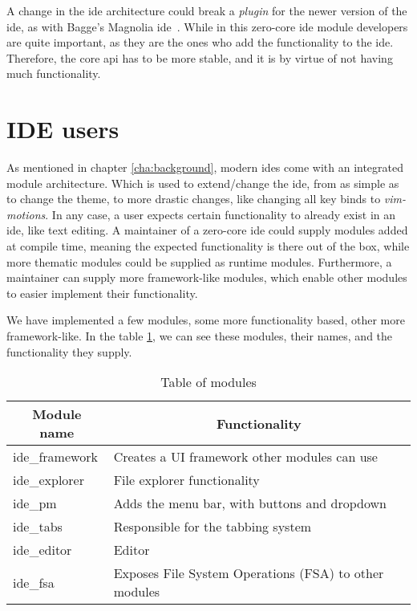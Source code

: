 A change in the \gls*{ide} architecture could break a \textit{plugin} for the
newer version of the \gls*{ide}, as with Bagge's Magnolia \gls*{ide}~\cite{baggeIde}.
While in this zero-core \gls*{ide} module developers are quite important, as they
are the ones who add the functionality to the \gls*{ide}. Therefore, the core
\gls*{api} has to be more stable, and it is by virtue of not having much
functionality.


\section{IDE users} \label{sec:user}

As mentioned in chapter \ref{cha:background}, modern \gls*{ide}s come with an
integrated module architecture. Which is used to extend/change the \gls*{ide},
from as simple as to change the theme, to more drastic changes, like changing
all key binds to \textit{vim-motions}. In any case, a user expects certain
functionality to already exist in an \gls*{ide}, like text editing. A maintainer
of a zero-core \gls*{ide} could supply modules added at compile time, meaning the
expected functionality is there out of the box, while more thematic modules
could be supplied as runtime modules. Furthermore, a maintainer can supply more
framework-like modules, which enable other modules to easier implement their
functionality.

We have implemented a few modules, some more functionality based, other more
framework-like. In the table \ref{tab:modules}, we can see these modules, their
names, and the functionality they supply.

\begin{table}[H]
  \caption{Table of modules}\label{tab:modules}
  \begin{center}
    \begin{tabular}[c]{l|l}
      \hline
      \multicolumn{1}{c|}{\textbf{Module name}} &
      \multicolumn{1}{c}{\textbf{Functionality}} \\
      \hline
      ide\_framework & Creates a UI framework other modules can use \\
      ide\_explorer & File explorer functionality \\
      ide\_pm & Adds the menu bar, with buttons and dropdown \\
      ide\_tabs & Responsible for the tabbing system \\
      ide\_editor & Editor \\
      ide\_fsa & Exposes File System Operations (FSA) to other modules \\
      \hline
    \end{tabular}
  \end{center}
\end{table}

